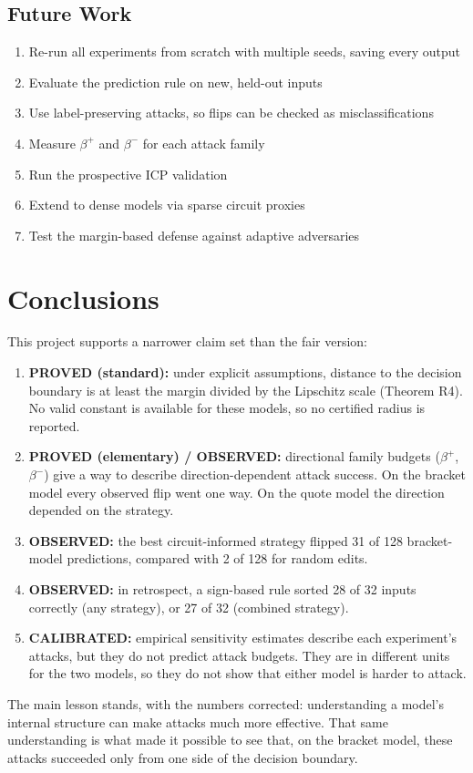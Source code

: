 \documentclass[11pt]{article}
\newcommand{\lab}[1]{{\footnotesize\MakeUppercase{#1}}}
\newcommand{\proved}{\lab{proved}}
\newcommand{\calibrated}{\lab{calibrated}}
\newcommand{\observed}{\lab{observed}}
\begin{document}
\subsection{Future Work}
\begin{enumerate}
  \item Re-run all experiments from scratch with multiple seeds, saving every output
  \item Evaluate the prediction rule on new, held-out inputs
  \item Use label-preserving attacks, so flips can be checked as misclassifications
  \item Measure $\beta^{+}$ and $\beta^{-}$ for each attack family
  \item Run the prospective ICP validation
  \item Extend to dense models via sparse circuit proxies~\cite{conmy2023}
  \item Test the margin-based defense against adaptive adversaries
\end{enumerate}

\section{Conclusions}
This project supports a narrower claim set than the fair version:
\begin{enumerate}
  \item \textbf{\proved{} (standard):} under explicit assumptions, distance to the decision boundary is at least the margin divided by the Lipschitz scale (Theorem R4). No valid constant is available for these models, so no certified radius is reported.
  \item \textbf{\proved{} (elementary) / \observed:} directional family budgets ($\beta^{+}$, $\beta^{-}$) give a way to describe direction-dependent attack success. On the bracket model every observed flip went one way. On the quote model the direction depended on the strategy.
  \item \textbf{\observed:} the best circuit-informed strategy flipped 31 of 128 bracket-model predictions, compared with 2 of 128 for random edits.
  \item \textbf{\observed:} in retrospect, a sign-based rule sorted 28 of 32 inputs correctly (any strategy), or 27 of 32 (combined strategy).
  \item \textbf{\calibrated:} empirical sensitivity estimates describe each experiment's attacks, but they do not predict attack budgets. They are in different units for the two models, so they do not show that either model is harder to attack.
\end{enumerate}
The main lesson stands, with the numbers corrected: understanding a model's internal structure can make attacks much more effective. That same understanding is what made it possible to see that, on the bracket model, these attacks succeeded only from one side of the decision boundary.
\end{document}
